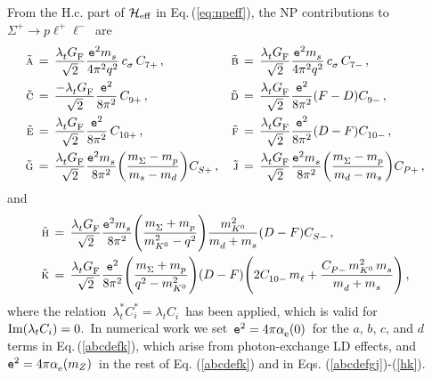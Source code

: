 \documentclass[amsmath,amssymb,aps,nofootinbib,prd,preprint,superscriptaddress,tightenlines,a4paper,bm]{revtex4-2}
\begin{document}
From the H.c. part of ${\cal H}_{\rm eff}$ in Eq.\,(\ref{eq:npeff}), the NP contributions to \,$\Sigma^+\to p\ell^+\ell^-$\, are
\begin{align}
\tilde{\textsc a} & \,=\, \frac{\lambda_t^{}G_{\rm F}^{}}{\sqrt2} \frac{{\tt e}^2m_s^{}}{4\pi^2 q^2}\, c_\sigma^{}\, C_{7+}^{} \,, &
\tilde{\textsc b} & \,=\, \frac{\lambda_t^{}G_{\rm F}^{}}{\sqrt2} \frac{{\tt e}^2m_s^{}}{4\pi^2 q^2}\, c_\sigma^{}\, C_{7-}^{} \,, \nonumber \\
\tilde{\textsc c} & \,=\, \frac{-\lambda_t^{}G_{\rm F}^{}}{\sqrt2} \frac{{\tt e}^2}{8\pi^2}\, C_{9+}^{} \,, &
\tilde{\textsc d} & \,=\, \frac{\lambda_t^{}G_{\rm F}^{}}{\sqrt2} \frac{{\tt e}^2}{8\pi^2} (F-D) C_{9-}^{}  \,, \nonumber \\
\tilde{\textsc e} & \,=\, \frac{\lambda_t^{}G_{\rm F}^{}}{\sqrt2} \frac{{\tt e}^2}{8\pi^2}\, C_{10+}^{} \,, &
\tilde{\textsc f} & \,=\, \frac{\lambda_t^{}G_{\rm F}^{}}{\sqrt2} \frac{{\tt e}^2}{8\pi^2} (D-F) C_{10-}^{}  \,, \nonumber \\
\tilde{\textsc g} & \,=\, \frac{\lambda_t^{}G_{\rm F}^{}}{\sqrt2} \frac{{\tt e}^2m_s^{}}{8\pi^2} \bigg( \frac{m_\Sigma^{}-m_p^{}}{m_s-m_d} \bigg) C_{S+}^{} \,, &
\tilde{\textsc j} & \,=\, \frac{\lambda_t^{}G_{\rm F}^{}}{\sqrt2} \frac{{\tt e}^2m_s^{}}{8\pi^2} \bigg( \frac{m_\Sigma^{}-m_p^{}}{m_d-m_s} \bigg) C_{P+}^{} \,, & \label{abcdefgj}
\end{align}
and
\begin{align} \label{hk}
\tilde{\textsc h} & \,=\,  \frac{\lambda_t^{}G_{\rm F}^{}}{\sqrt2} \frac{{\tt e}^2 m_s^{}}{8\pi^2} \Bigg( \frac{m_\Sigma^{}+m_p^{}}{m_{K^0}^2-q^2}\Bigg)\frac{m_{K^0}^2}{m_d^{}+m_s^{}} (D-F) C_{S-}^{} \,, \nonumber \\
\tilde{\textsc k} & \,=\, \frac{\lambda_t^{}G_{\rm F}^{}}{\sqrt2} \frac{{\tt e}^2}{8\pi^2} \Bigg( \frac{m_\Sigma^{}+m_p^{}}{q^2-m_{K^0}^2} \Bigg) (D-F)\Bigg( 2 C_{10-}^{}\, m_\ell^{} + \frac{C_{P-}^{}\, m_{K^0}^2\, m_s^{}}{m_d^{}+m_s^{}} \Bigg) \,, &
\end{align}
where the relation \,$\lambda_t^*C_i^*=\lambda_t^{}C_i^{}$\, has been applied, which is valid for \,${\rm Im}(\lambda_tC_i)=0$.\,
In numerical work we set \,${\tt e}^2 = 4\pi\alpha_{\rm e}^{}(0)$\, for the $a$, $b$, $c$, and $d$ terms in Eq.\,(\ref{abcdefk}), which arise from photon-exchange LD effects, and \,${\tt e}^2 = 4\pi\alpha_{\rm e}^{}(m_Z)$\, in the rest of Eq.\,\,(\ref{abcdefk}) and in Eqs.\,\,(\ref{abcdefgj})-(\ref{hk}).
\end{document}
